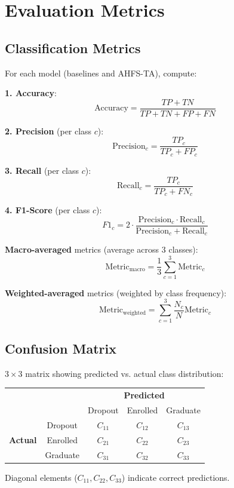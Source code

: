 \section{Evaluation Metrics}

\subsection{Classification Metrics}

For each model (baselines and AHFS-TA), compute:

\textbf{1. Accuracy}:
$$\text{Accuracy} = \frac{TP + TN}{TP + TN + FP + FN}$$

\textbf{2. Precision} (per class $c$):
$$\text{Precision}_c = \frac{TP_c}{TP_c + FP_c}$$

\textbf{3. Recall} (per class $c$):
$$\text{Recall}_c = \frac{TP_c}{TP_c + FN_c}$$

\textbf{4. F1-Score} (per class $c$):
$$F1_c = 2 \cdot \frac{\text{Precision}_c \cdot \text{Recall}_c}{\text{Precision}_c + \text{Recall}_c}$$

\textbf{Macro-averaged} metrics (average across 3 classes):
$$\text{Metric}_{\text{macro}} = \frac{1}{3} \sum_{c=1}^{3} \text{Metric}_c$$

\textbf{Weighted-averaged} metrics (weighted by class frequency):
$$\text{Metric}_{\text{weighted}} = \sum_{c=1}^{3} \frac{N_c}{N} \text{Metric}_c$$

\subsection{Confusion Matrix}

$3 \times 3$ matrix showing predicted vs. actual class distribution:

\begin{table}[h]
\centering
\begin{tabular}{cc|ccc}
& & \multicolumn{3}{c}{\textbf{Predicted}} \\
& & Dropout & Enrolled & Graduate \\
\hline
\multirow{3}{*}{\textbf{Actual}} & Dropout & $C_{11}$ & $C_{12}$ & $C_{13}$ \\
& Enrolled & $C_{21}$ & $C_{22}$ & $C_{23}$ \\
& Graduate & $C_{31}$ & $C_{32}$ & $C_{33}$ \\
\end{tabular}
\end{table}

Diagonal elements ($C_{11}, C_{22}, C_{33}$) indicate correct predictions.

